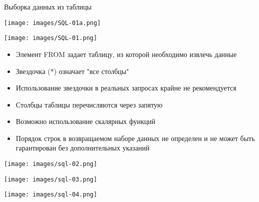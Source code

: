 \documentclass{beamer}
\begin{document}
\begin{frame}{Выборка данных из таблицы}
	\begin{minipage}{0.4\textwidth}
		\begin{flushleft}
			\begin{center}
				\texttt{[image: images/SQL-01a.png]}
		  	\end{center}
			\begin{center}
				\texttt{[image: images/SQL-01.png]}
		  	\end{center}
	  	\end{flushleft}  	
	\end{minipage}
	\begin{minipage}{0.5\textwidth}
		\begin{flushright}
			\begin{itemize}
				\item Элемент FROM задает таблицу, из которой необходимо извлечь данные
				\item Звездочка (*) означает "все столбцы"
				\item Использование звездочки в реальных запросах крайне не рекомендуется
				\item Столбцы таблицы перечисляются через запятую
				\item Возможно использование скалярных функций
				\item Порядок строк в возвращаемом наборе данных не определен и не может быть гарантирован без дополнительных указаний
			\end{itemize}
		\end{flushright}
	\end{minipage}
\end{frame}

\begin{frame}
	\begin{center}
		\texttt{[image: images/sql-02.png]}
	\end{center}
\end{frame} 

\begin{frame}
	\begin{center}
		\texttt{[image: images/sql-03.png]}
	\end{center}
\end{frame} 

\begin{frame}
	\begin{center}
		\texttt{[image: images/sql-04.png]}
	\end{center}
\end{frame} 
\end{document}

